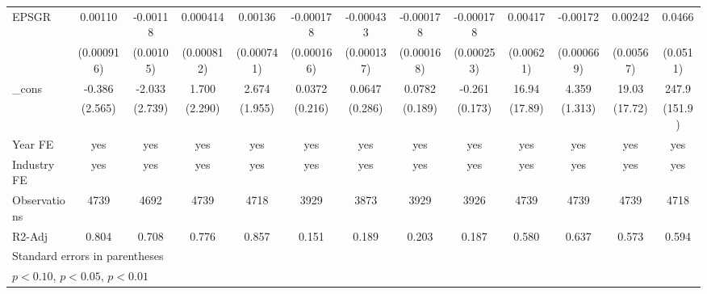 {\begin{tabular}{l*{12}{c}}
EPSGR               &     0.00110         &    -0.00118         &    0.000414         &     0.00136\sym{*}  &   -0.000178         &   -0.000433\sym{***}&   -0.000178         &   -0.000178         &     0.00417         &    -0.00172\sym{**} &     0.00242         &      0.0466         \\
                    &  (0.000916)         &   (0.00105)         &  (0.000812)         &  (0.000741)         &  (0.000166)         &  (0.000137)         &  (0.000168)         &  (0.000253)         &   (0.00621)         &  (0.000669)         &   (0.00567)         &    (0.0511)         \\
\_cons              &      -0.386         &      -2.033         &       1.700         &       2.674         &      0.0372         &      0.0647         &      0.0782         &      -0.261         &       16.94         &       4.359\sym{***}&       19.03         &       247.9         \\
                    &     (2.565)         &     (2.739)         &     (2.290)         &     (1.955)         &     (0.216)         &     (0.286)         &     (0.189)         &     (0.173)         &     (17.89)         &     (1.313)         &     (17.72)         &     (151.9)         \\
\hline
Year FE             &         yes         &         yes         &         yes         &         yes         &         yes         &         yes         &         yes         &         yes         &         yes         &         yes         &         yes         &         yes         \\
Industry FE         &         yes         &         yes         &         yes         &         yes         &         yes         &         yes         &         yes         &         yes         &         yes         &         yes         &         yes         &         yes         \\
Observations        &        4739         &        4692         &        4739         &        4718         &        3929         &        3873         &        3929         &        3926         &        4739         &        4739         &        4739         &        4718         \\
R2-Adj              &       0.804         &       0.708         &       0.776         &       0.857         &       0.151         &       0.189         &       0.203         &       0.187         &       0.580         &       0.637         &       0.573         &       0.594         \\
\hline\hline
\multicolumn{13}{l}{\footnotesize Standard errors in parentheses}\\
\multicolumn{13}{l}{\footnotesize \sym{*} \(p<0.10\), \sym{**} \(p<0.05\), \sym{***} \(p<0.01\)}\\
\end{tabular}
}

